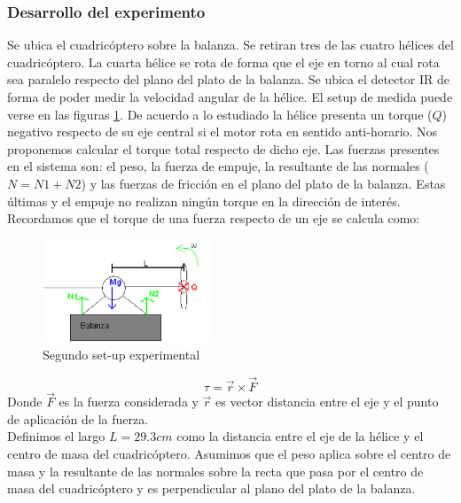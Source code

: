 \documentclass[main]{subfiles}
\begin{document}
\subsubsection*{Desarrollo del experimento}
\label{sub:torque}
Se ubica el cuadric\'optero sobre la balanza. Se retiran tres de las cuatro h\'elices del cuadric\'optero. La cuarta h\'elice se rota de forma que el eje en torno al cual rota sea paralelo respecto del plano del plato de la balanza. Se ubica el detector IR de forma de poder medir la velocidad angular de la h\'elice. El setup de medida puede verse en las figuras \ref{fig:setup2}. De acuerdo a lo estudiado la h\'elice presenta un torque ($Q$) negativo respecto de su eje central si el motor rota en sentido anti-horario. Nos proponemos calcular el torque total respecto de dicho eje. Las fuerzas presentes en el sistema son: el peso, la fuerza de empuje, la resultante de las normales ($N = N1+N2$) y las fuerzas de fricci\'on en el plano del plato de la balanza. Estas \'ultimas y el empuje no realizan ning\'un torque en la direcci\'on de inter\'es. Recordamos que el torque de una fuerza respecto de un eje se calcula como:
\begin{figure}
  \vspace{0pt}
  \begin{center}
    \includegraphics[width=0.45\textwidth]{./pics_motores/set2.pdf}
  \end{center}
  \vspace{-15pt}
  \caption{Segundo set-up experimental}
  \label{fig:setup2}
  \vspace{10pt}
\end{figure}
$$
\tau=\vec{r} \times \vec{F} 
$$
Donde $\vec{F}$ es la fuerza considerada y $\vec{r}$ es vector distancia entre el eje y el punto de aplicaci\'on de la fuerza.\\

Definimos el largo $L=29.3cm$ como la distancia entre el eje de la h\'elice y el centro de masa del cuadric\'optero. Asumimos que el peso aplica sobre el centro de masa y la resultante de las normales sobre la recta que pasa por el centro de masa del cuadric\'optero y es perpendicular al plano del plato de la balanza. 
\end{document}
